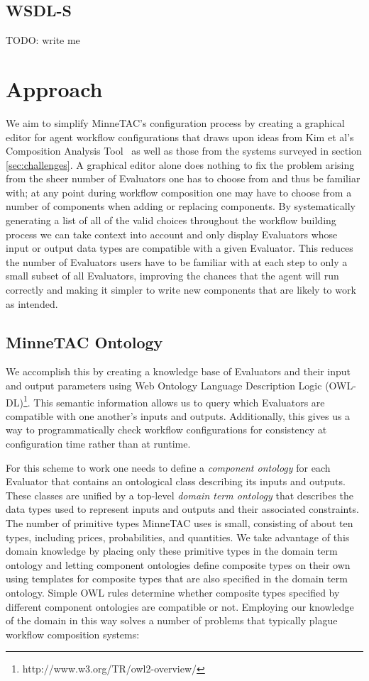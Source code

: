 \documentclass{article}
\begin{document}
\subsection{WSDL-S}

TODO:  write me

\section{Approach}

We aim to simplify MinneTAC's configuration process by creating a graphical editor for agent workflow configurations that draws upon ideas from Kim et al's Composition Analysis Tool~\cite{kim2004intelligent} as well as those from the systems surveyed in section \ref{sec:challenges}.
A graphical editor alone does nothing to fix the problem arising from the sheer number of Evaluators one has to choose from and thus be familiar with; at any point during workflow composition one may have to choose from a number of components when adding or replacing components.
By systematically generating a list of all of the valid choices throughout the workflow building process we can take context into account and only display Evaluators whose input or output data types are compatible with a given Evaluator.
This reduces the number of Evaluators users have to be familiar with at each step to only a small subset of all Evaluators, improving the chances that the agent will run correctly and making it simpler to write new components that are likely to work as intended.

\subsection{MinneTAC Ontology}

We accomplish this by creating a knowledge base of Evaluators and their input and output parameters using Web Ontology Language Description Logic (OWL-DL)\footnote{http://www.w3.org/TR/owl2-overview/}.
This semantic information allows us to query which Evaluators are compatible with one another's inputs and outputs.
Additionally, this gives us a way to programmatically check workflow configurations for consistency at configuration time rather than at runtime.

For this scheme to work one needs to define a \emph{component ontology} for each Evaluator that contains an ontological class describing its inputs and outputs.
These classes are unified by a top-level \emph{domain term ontology} that describes the data types used to represent inputs and outputs and their associated constraints.
The number of primitive types MinneTAC uses is small, consisting of about ten types, including prices, probabilities, and quantities.
We take advantage of this domain knowledge by placing only these primitive types in the domain term ontology and letting component ontologies define composite types on their own using templates for composite types that are also specified in the domain term ontology.
Simple OWL rules determine whether composite types specified by different component ontologies are compatible or not.
Employing our knowledge of the domain in this way solves a number of problems that typically plague workflow composition systems:
\end{document}
